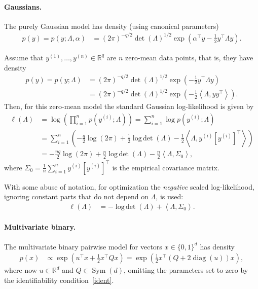 \documentclass{article}
\newcommand{\IR}{{\mathbb{R}}}\newcommand{\IN}{{\mathbb{N}}}
\newcommand{\bPe}[1]{\ensuremath{\left[#1 \right]}} %
\newcommand{\bPr}[1]{\ensuremath{\left(#1 \right)}} %
\newcommand{\scalp}[1]{ \left\langle #1\right\rangle} %
\DeclareMathOperator{\diag}{diag}
\DeclareMathOperator{\Sym}{Sym}
\DeclareMathOperator{\logdet}{log\,det}
\begin{document}
\paragraph{Gaussians.}
The purely Gaussian model has density (using canonical parameters)
\begin{align*}
p(y)=p(y;\Lambda, \alpha)&=(2\pi)^{-q/2}\det(\Lambda)^{1/2}\exp\bPr{\alpha^\top y  -\frac{1}{2}y^\top\Lambda y}.
\end{align*}

Assume that $y^{(1)}, \ldots, y^{(n)}\in\IR^{q}$ are $n$ zero-mean data points, that is, they have density
\begin{align*}
p(y)=p(y; \Lambda)&=(2\pi)^{-q/2}\det(\Lambda)^{1/2}\exp\bPr{-\frac{1}{2}y^\top\Lambda y} 
\\&= (2\pi)^{-q/2}\det(\Lambda)^{1/2}\exp\bPr{-\frac{1}{2}\scalp{\Lambda, y y^\top}}.
\end{align*}
Then, for this zero-mean model the standard Gaussian log-likelihood is given by
\begin{align*}
	\ell(\Lambda) &= \log\bPr{\prod_{i=1}^n p(y^{(i)}; \Lambda)}
	= \sum_{i=1}^n \log p(y^{(i)}; \Lambda)
	\\ &= \sum_{i=1}^n \bPr{-\frac{q}{2}\log(2\pi) + \frac{1}{2}\logdet(\Lambda) - \frac{1}{2}\scalp{\Lambda, y^{(i)}\bPe{y^{(i)}}^\top}}
	\\ &=  -\frac{n q}{2}\log(2\pi) + \frac{n}{2}\logdet(\Lambda) - \frac{n}{2}\scalp{\Lambda, \Sigma_0},
\end{align*}
where $\Sigma_0 = \frac{1}{n}\sum_{i=1}^n y^{(i)}\bPe{y^{(i)}}^\top$ is the empirical covariance matrix.

With some abuse of notation, for optimization the \emph{negative} scaled log-likelihood, ignoring constant parts that do not depend on $\Lambda$, is used:
\begin{align}
	\ell(\Lambda) &= -\logdet(\Lambda) + \scalp{\Lambda, \Sigma_0}. \label{lh_gaussian}
\end{align}

\paragraph{Multivariate binary.}
The multivariate binary pairwise model for vectors $x\in\{0,1\}^{d}$ has density
\begin{align*}
p(x)&\propto\exp\bPr{u^\top x + \frac{1}{2}x^\top Q x} = \exp\bPr{\frac{1}{2}x^\top \bPr{Q + 2\diag(u)} x},
\end{align*}
where now $u\in\IR^{d}$ and $Q\in\Sym(d)$, omitting the parameters set to zero by the identifiability condition~\eqref{ident}. 
\medskip
\end{document}

